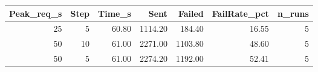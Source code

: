 \begin{tabular}{rrrrrrr}
\toprule
Peak\_req\_s & Step & Time\_s & Sent & Failed & FailRate\_pct & n\_runs \\
\midrule
25 & 5 & 60.80 & 1114.20 & 184.40 & 16.55 & 5 \\
50 & 10 & 61.00 & 2271.00 & 1103.80 & 48.60 & 5 \\
50 & 5 & 61.00 & 2274.20 & 1192.00 & 52.41 & 5 \\
\bottomrule
\end{tabular}
